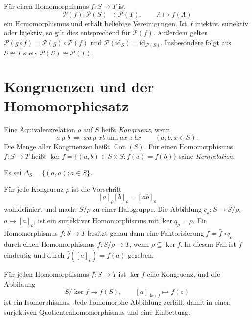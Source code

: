 \begin{theorem}
Für einen Homomorphismus $f:S\to T$ ist
\[
 \mathcal P(f):\mathcal P(S)\to\mathcal P(T),\qquad
 A\mapsto f(A)
\]
ein Homomorphismus und erhält beliebige Vereinigungen.
Ist $f$ injektiv, surjektiv oder bijektiv, so gilt dies entsprechend
für $\mathcal P(f)$. Außerdem gelten
$\mathcal P(g\circ f)=\mathcal P(g)\circ\mathcal P(f)$ und
$\mathcal P(\mathrm{id}_S)=\mathrm{id}_{\mathcal P(S)}$.
Insbesondere folgt aus $S\cong T$ stets
$\mathcal P(S)\cong\mathcal P(T)$.
\cite{projectpower}
\end{theorem}

\section{Kongruenzen und der Homomorphiesatz}

\begin{definition}
Eine Äquivalenzrelation $\rho$ auf $S$ heißt \emph{Kongruenz}, wenn
\[
 a\mathrel{\rho}b\ \Longrightarrow\
 xa\mathrel{\rho}xb\ \text{und}\ ax\mathrel{\rho}bx
 \qquad(a,b,x\in S).
\]
Die Menge aller Kongruenzen heißt $\operatorname{Con}(S)$.
Für einen Homomorphismus $f:S\to T$ heißt $\ker f=\{(a,b)\in S\times S:f(a)=f(b)\}$ seine \emph{Kernrelation}.

Es sei $\Delta_S=\{(a,a):a\in S\}$.
\end{definition}

\begin{theorem}
\label{b28guide:thm:quotient}
Für jede Kongruenz $\rho$ ist die Vorschrift
\[
 [a]_\rho[b]_\rho=[ab]_\rho
\]
wohldefiniert und macht $S/\rho$ zu einer Halbgruppe.
Die Abbildung $q_\rho:S\to S/\rho$, $a\mapsto[a]_\rho$, ist
ein surjektiver Homomorphismus mit $\ker q_\rho=\rho$.
Ein Homomorphismus $f:S\to T$ besitzt genau dann eine
Faktorisierung $f=\bar f\circ q_\rho$ durch einen Homomorphismus
$\bar f:S/\rho\to T$, wenn $\rho\subseteq\ker f$.
In diesem Fall ist $\bar f$ eindeutig und durch
$\bar f([a]_\rho)=f(a)$ gegeben.
\cite{harju,gould}
\end{theorem}

\begin{theorem}
\label{b28guide:thm:first-iso}
Für jeden Homomorphismus $f:S\to T$ ist $\ker f$ eine Kongruenz,
und die Abbildung
\[
 S/\ker f\longrightarrow f(S),\qquad [a]_{\ker f}\longmapsto f(a)
\]
ist ein Isomorphismus. Jede homomorphe Abbildung zerfällt damit
in einen surjektiven Quotientenhomomorphismus und eine Einbettung.
\cite{harju,gould}
\end{theorem}


